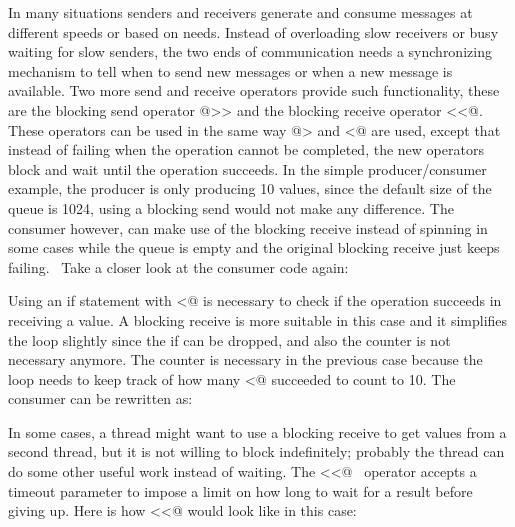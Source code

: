 In many situations senders and receivers generate and consume messages
at different speeds or based on needs. Instead of overloading slow
receivers or busy waiting for slow senders, the two ends of
communication needs a synchronizing mechanism to tell when to send new
messages or when a new message is available. Two more send and receive
operators provide such functionality, these are the blocking send
operator \textsf{@{\textgreater}{\textgreater}} and the
blocking receive operator
\textsf{{\textless}{\textless}@.} These operators can
be used in the same way \textsf{@{\textgreater}} and
\textsf{{\textless}@} are used, except that instead of
failing when the operation cannot be completed, the new operators block
and wait until the operation succeeds. In the simple producer/consumer
example, the producer is only producing 10 values, since the default
size of the queue is 1024, using a blocking send would not make any
difference. The consumer however, can make use of the blocking receive
instead of spinning in some cases while the queue is empty and the
original blocking receive just keeps failing. \ Take a closer look at
the consumer code again:


Using an \textsf{if} statement with
\textsf{{\textless}@} is necessary to check if the
operation succeeds in receiving a value. A blocking receive is more
suitable in this case and it simplifies the loop slightly since the
\textsf{if} can be dropped, and also the counter is not
necessary anymore. The counter is necessary in the previous case
because the loop needs to keep track of how many
\textsf{{\textless}@} succeeded to count to 10. The
consumer can be rewritten as:


In some cases, a thread might want to use a blocking receive to get
values from a second thread, but it is not willing to block
indefinitely; probably the thread can do some other useful work instead
of waiting. The \textsf{{\textless}{\textless}@}
\ operator accepts a timeout parameter to impose a limit on how long to
wait for a result before giving up. Here is how
\textsf{{\textless}{\textless}@} would look like in
this case:

